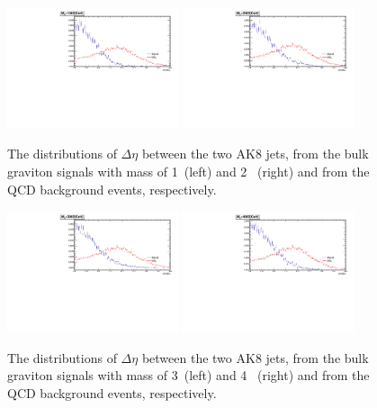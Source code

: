 \begin{figure}[htbp]
   \centering
   \includegraphics[width=0.45\textwidth]{figures/optimization/deta/dEtawithoutMjjCutM1000.pdf}
   \includegraphics[width=0.45\textwidth]{figures/optimization/deta/dEtawithoutMjjCutM2000.pdf}
   \caption{The distributions of $\Delta \eta$ between the two AK8 jets,  
     from the bulk graviton signals with mass of 1~\TeV (left) and 2~\TeV 
     (right) and from the QCD background events, respectively. }
   \label{fig:detaOne}
\end{figure}


\begin{figure}[htbp]
   \centering
   \includegraphics[width=0.45\textwidth]{figures/optimization/deta/dEtawithoutMjjCutM3000.pdf}
   \includegraphics[width=0.45\textwidth]{figures/optimization/deta/dEtawithoutMjjCutM4000.pdf}
   \caption{The distributions of $\Delta \eta$ between the two AK8 jets,  
     from the bulk graviton signals with mass of 3~\TeV (left) and 4~\TeV 
     (right) and from the QCD background events, respectively. }
   \label{fig:detaTwo}
\end{figure}

